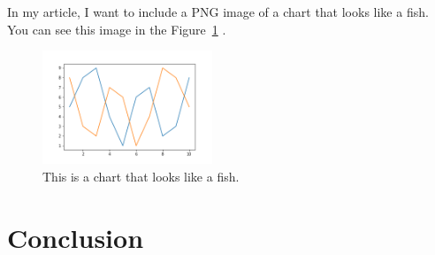 \documentclass{proc}
\begin{document}
  In my article, I want to include a PNG image of a chart that looks like a fish. You can see this image in the Figure~\ref{fig:fish} .
  \begin{figure}[htbp]
    \begin{center}
				\includegraphics[width=2in]{graph.png}
        \caption{This is a chart that looks like a fish.}
        \label{fig:fish}
    \end{center}
  \end{figure}

     

\section{Conclusion}
  
\end{document}
